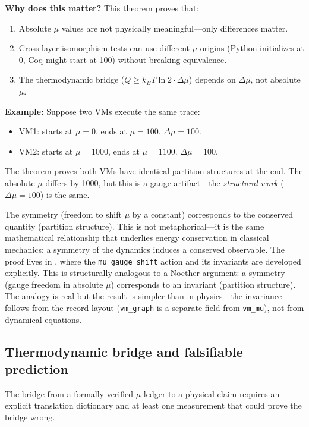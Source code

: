 \textbf{Why does this matter?} This theorem proves that:
\begin{enumerate}
    \item Absolute $\mu$ values are not physically meaningful---only differences matter.
    \item Cross-layer isomorphism tests can use different $\mu$ origins (Python initializes at 0, Coq might start at 100) without breaking equivalence.
    \item The thermodynamic bridge ($Q \geq k_B T \ln 2 \cdot \Delta\mu$) depends on $\Delta\mu$, not absolute $\mu$.
\end{enumerate}

\textbf{Example:} Suppose two VMs execute the same trace:
\begin{itemize}
    \item VM1: starts at $\mu = 0$, ends at $\mu = 100$. $\Delta\mu = 100$.
    \item VM2: starts at $\mu = 1000$, ends at $\mu = 1100$. $\Delta\mu = 100$.
\end{itemize}
The theorem proves both VMs have identical partition structures at the end. The absolute $\mu$ differs by 1000, but this is a gauge artifact---the \textit{structural work} ($\Delta\mu = 100$) is the same.


The symmetry (freedom to shift $\mu$ by a constant) corresponds to the conserved quantity (partition structure). This is not metaphorical—it is the same mathematical relationship that underlies energy conservation in classical mechanics: a symmetry of the dynamics induces a conserved observable.
The proof lives in , where the \texttt{mu\_gauge\_shift} action and its invariants are developed explicitly. This is structurally analogous to a Noether argument: a symmetry (gauge freedom in absolute $\mu$) corresponds to an invariant (partition structure). The analogy is real but the result is simpler than in physics---the invariance follows from the record layout (\texttt{vm\_graph} is a separate field from \texttt{vm\_mu}), not from dynamical equations.

\subsection{Thermodynamic bridge and falsifiable prediction}

The bridge from a formally verified $\mu$-ledger to a physical claim requires an explicit translation dictionary and at least one measurement that could prove the bridge wrong.

